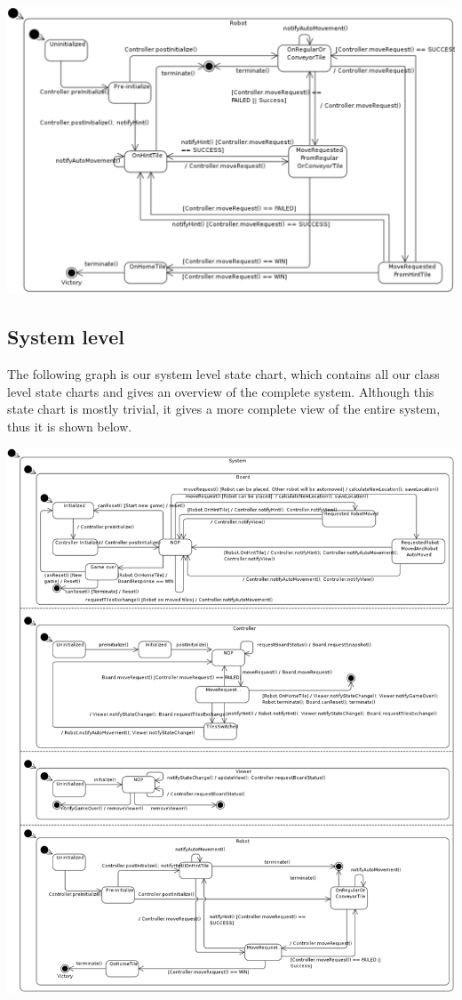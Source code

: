 	\includegraphics[width=\linewidth]{statecharts/robot.pdf}

\subsection{System level}
	The following graph is our system level state chart, which contains all our class level state charts and gives an overview of the complete system. Although this state chart is mostly trivial, it gives a more complete view of the entire system, thus it is shown below.

	\includegraphics[width=\linewidth]{statecharts/system.pdf}

	
